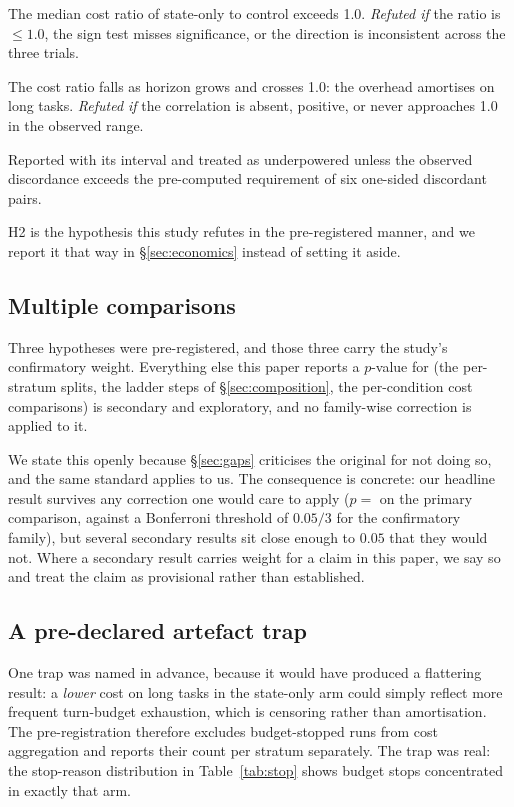 \begin{description}[style=nextline]
\item[H1 (cost).] The median cost ratio of state-only to control exceeds
  1.0. \emph{Refuted if} the ratio is $\le 1.0$, the sign test misses
  significance, or the direction is inconsistent across the three trials.
\item[H2 (horizon).] The cost ratio falls as horizon grows and crosses 1.0:
  the overhead amortises on long tasks. \emph{Refuted if} the correlation is
  absent, positive, or never approaches 1.0 in the observed range.
\item[H3 (capability).] Reported with its interval and treated as
  underpowered unless the observed discordance exceeds the pre-computed
  requirement of six one-sided discordant pairs.
\end{description}

H2 is the hypothesis this study refutes in the pre-registered manner, and we
report it that way in \S\ref{sec:economics} instead of setting it aside.

\subsection{Multiple comparisons}

Three hypotheses were pre-registered, and those three carry the study's
confirmatory weight. Everything else this paper reports a $p$-value for (the
per-stratum splits, the ladder steps of \S\ref{sec:composition}, the
per-condition cost comparisons) is secondary and exploratory, and no
family-wise correction is applied to it.

We state this openly because \S\ref{sec:gaps} criticises the original for
not doing so, and the same standard applies to us. The consequence is
concrete: our headline result survives any correction one would care to
apply ($p={}$\McnPTailZero{} on the primary comparison, against a Bonferroni
threshold of $0.05/3$ for the confirmatory family), but several secondary
results sit close enough to $0.05$ that they would not. Where a secondary
result carries weight for a claim in this paper, we say so and treat the
claim as provisional rather than established.

\subsection{A pre-declared artefact trap}

One trap was named in advance, because it would have produced a flattering
result: a \emph{lower} cost on long tasks in the state-only arm could simply
reflect more frequent turn-budget exhaustion, which is censoring rather
than amortisation. The pre-registration therefore excludes budget-stopped
runs from cost aggregation and reports their count per stratum separately.
The trap was real: the stop-reason distribution in Table~\ref{tab:stop}
shows budget stops concentrated in exactly that arm.

